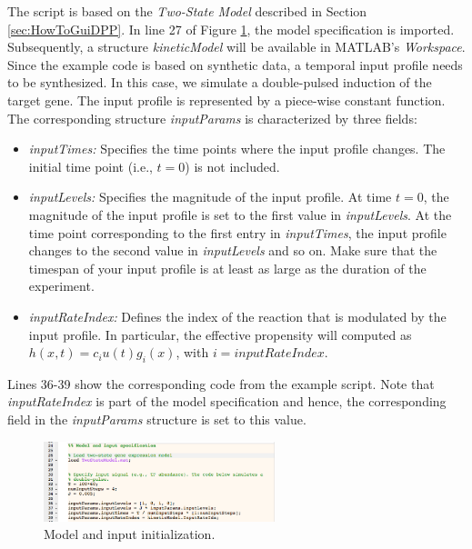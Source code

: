\documentclass[a4paper, 9pt]{scrartcl}
\begin{document}
The script is based on the \textit{Two-State Model} described in Section \ref{sec:HowToGuiDPP}. In line 27 of Figure \ref{fig:Model}, the model specification is imported. Subsequently, a structure \textit{kineticModel} will be available in MATLAB's \textit{Workspace}. Since the example code is based on synthetic data, a temporal input profile needs to be synthesized. In this case, we simulate a double-pulsed induction of the target gene. The input profile is represented by a piece-wise constant function. The corresponding structure \textit{inputParams} is characterized by three fields:
	\begin{itemize}
		\item \textit{inputTimes:} Specifies the time points where the input profile changes. The initial time point (i.e., $t=0$) is not included.
		\item \textit{inputLevels:} Specifies the magnitude of the input profile. At time $t=0$, the magnitude of the input profile is set to the first value in \textit{inputLevels}. At the time point corresponding to the first entry in \textit{inputTimes}, the input profile changes to the second value in \textit{inputLevels} and so on. Make sure that the timespan of your input profile is at least as large as the duration of the experiment.
		\item \textit{inputRateIndex:} Defines the index of the reaction that is modulated by the input profile. In particular, the effective propensity will computed as $h(x, t)=c_{i} u(t) g_{i}(x)$, with $i=inputRateIndex$.
	\end{itemize}
	
Lines 36-39 show the corresponding code from the example script. Note that \textit{inputRateIndex} is part of the model specification and hence, the corresponding field in the \textit{inputParams} structure is set to this value.

\begin{figure}[htbp]
\begin{center}
	\includegraphics[width=0.6\textwidth]{figures/Doc_Model}
\caption{Model and input initialization.}
\label{fig:Model}
\end{center}
\end{figure}
\end{document}
